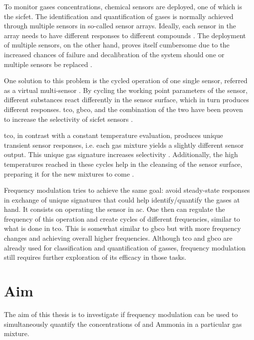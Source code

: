 {To monitor gases concentrations, chemical sensors are deployed, one of which is the \acrfull{sicfet}. The identification and quantification of gases is normally achieved through multiple sensors in so-called sensor arrays. Ideally, each sensor in the array needs to have different responses to different compounds \parencite{Bastuck_2019}. The deployment of multiple sensors, on the other hand, proves itself cumbersome due to the increased chances of failure and decalibration of the system should one or multiple sensors be replaced \parencite{Bastuck_2019}.

One solution to this problem is the cycled operation of one single sensor, referred as a virtual multi-sensor \parencite{Bastuck_2019}. By cycling the working point parameters of the sensor, different substances react differently in the sensor surface, which in turn produces different responses. \acrfull{tco}, \acrfull{gbco}, and the combination of the two have been proven to increase the selectivity of \acrshort{sicfet} sensors \parencite{Bastuck_2019}.

\acrshort{tco}, in contrast with a constant temperature evaluation, produces unique transient sensor responses, i.e. each gas mixture yields a slightly different sensor output. This unique gas signature increases selectivity \parencite{bur2014}. Additionally, the high temperatures reached in these cycles help in the cleansing of the sensor surface, preparing it for the new mixtures to come \parencite{Bur791934}.

Frequency modulation tries to achieve the same goal: avoid steady-state responses in exchange of unique signatures that could help identify/quantify the gases at hand. It consists on operating the sensor in \acrfull{ac}. One then can regulate the frequency of this operation and create cycles of different frequencies, similar to what is done in \acrshort{tco}. This is somewhat similar to \acrshort{gbco} but with more frequency changes and achieving overall higher frequencies. Although \acrshort{tco} and \acrshort{gbco} are already used for classification and quantification of gasses, frequency modulation still requires further exploration of its efficacy in those tasks.

\section{Aim}
\label{sec:aim}

The aim of this thesis is to investigate if frequency modulation can be used to simultaneously quantify the concentrations of \nox and Ammonia in a particular gas mixture. 

}
